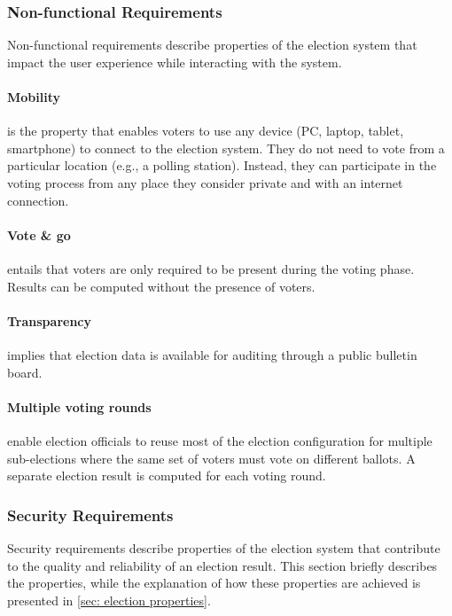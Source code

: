 \subsubsection{Non-functional Requirements} \label{sec: non-functional requirements}
Non-functional requirements describe properties of the election system that impact the user experience while interacting with the system. 

\paragraph{Mobility} is the property that enables voters to use any device (PC, laptop, tablet, smartphone) to connect to the election system. They do not need to vote from a particular location (e.g., a polling station). Instead, they can participate in the voting process from any place they consider private and with an internet connection.

\paragraph{Vote \& go} entails that voters are only required to be present during the voting phase. Results can be computed without the presence of voters.

\paragraph{Transparency} implies that election data is available for auditing through a public bulletin board.

\paragraph{Multiple voting rounds} enable election officials to reuse most of the election configuration for multiple sub-elections where the same set of voters must vote on different ballots. A separate election result is computed for each voting round. 


\subsubsection{Security Requirements} \label{sec: security requirements}
Security requirements describe properties of the election system that contribute to the quality and reliability of an election result. This section briefly describes the properties, while the explanation of how these properties are achieved is presented in \cref{sec: election properties}.

